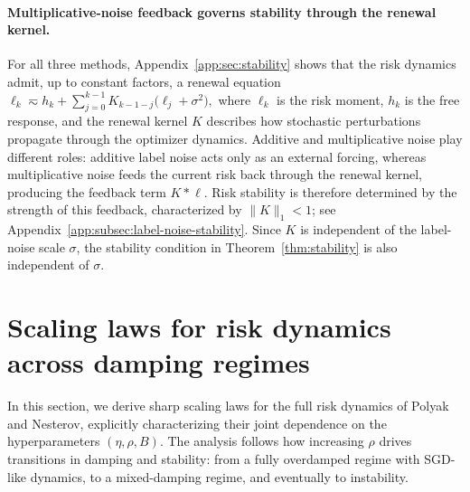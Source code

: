 \documentclass[11pt]{article}
\begin{document}
\paragraph{Multiplicative-noise feedback governs stability through the renewal kernel.} For all three methods, Appendix~\ref{app:sec:stability} shows that the risk dynamics admit, up to constant factors, a renewal equation
$
\ell_k\eqsim h_k+\sum_{j=0}^{k-1}K_{k-1-j}\bigl(\ell_j+\sigma^2\bigr),
$
where \(\ell_k\) is the risk moment, \(h_k\) is the free response, and the renewal kernel \(K\) describes how stochastic perturbations propagate through the optimizer dynamics. Additive and multiplicative noise play different roles: additive label noise acts only as an external forcing, whereas multiplicative noise feeds the current risk back through the renewal kernel, producing the feedback term \(K*\ell\). Risk stability is therefore determined by the strength of this feedback, characterized by \(\|K\|_1<1\); see Appendix~\ref{app:subsec:label-noise-stability}. Since \(K\) is independent of the label-noise scale \(\sigma\), the stability condition in Theorem~\ref{thm:stability} is also independent of \(\sigma\). 



\section{Scaling laws for risk dynamics across damping regimes}
\label{sec:scaling law}

In this section, we derive sharp scaling laws for the full risk dynamics of Polyak and Nesterov, explicitly characterizing their joint dependence on the hyperparameters \((\eta,\rho,B)\). The analysis follows how increasing \(\rho\) drives transitions in damping and stability: from a fully overdamped regime with SGD-like dynamics, to a mixed-damping regime, and eventually to instability.
\end{document}
